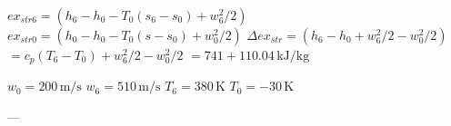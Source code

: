 \( ex_{str6} = (h_6 - h_0 - T_0(s_6 - s_0) + w_6^2 / 2) \)  
\( ex_{str0} = (h_0 - h_0 - T_0(s - s_0) + w_0^2 / 2) \)  
\( \Delta ex_{str} = (h_6 - h_0 + w_6^2 / 2 - w_0^2 / 2) \)  
\( = c_p(T_6 - T_0) + w_6^2 / 2 - w_0^2 / 2 \)  
\( = 741 + 110.04 \, \text{kJ/kg} \)  

\( w_0 = 200 \, \text{m/s} \)  
\( w_6 = 510 \, \text{m/s} \)  
\( T_6 = 380 \, \text{K} \)  
\( T_0 = -30 \, \text{K} \)  

---